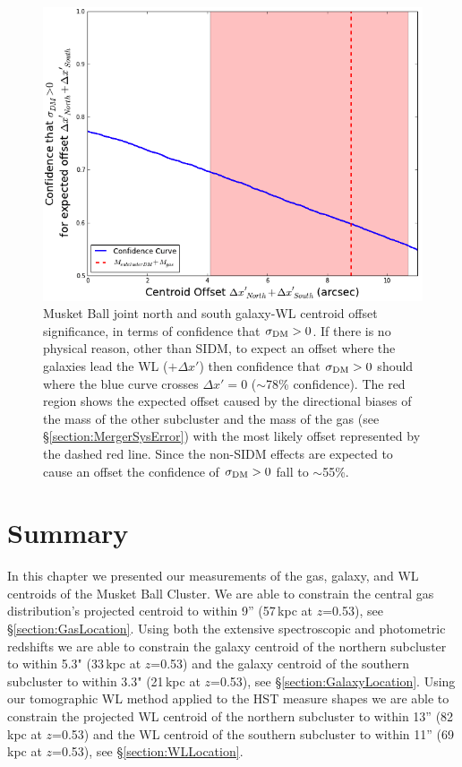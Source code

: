 \begin{figure}
\centering
\includegraphics[width=5in]{Chapter4/AnalysisFiles/NorthSouthJointAnalysis_delxPC.png}
\caption[Musket Ball joint northern and southern subcluster galaxy and weak lensing centroid offset significance.]{
Musket Ball joint north and south galaxy-WL centroid offset significance, in terms of confidence that $\sigma_{\rm DM}>0$.
If there is no physical reason, other than SIDM, to expect an offset where the galaxies lead the WL ($+\Delta x'$) then confidence that $\sigma_{\rm DM}>0$ should where the blue curve crosses $\Delta x'=0$ ($\sim$78\% confidence).
The red region shows the expected offset caused by the directional biases of the mass of the other subcluster and the mass of the gas (see \S\ref{section:MergerSysError}) with the most likely offset represented by the dashed red line.
Since the non-SIDM effects are expected to cause an offset the confidence of $\sigma_{\rm DM}>0$ fall to $\sim$55\%.
}
\label{figure:CentroidSignificance_NorthPlusSouth}
\end{figure}

\section{Summary}

In this chapter we presented our measurements of the gas, galaxy, and WL centroids of the Musket Ball Cluster.
We are able to constrain the central gas distribution's projected centroid to within 9'' (57\,kpc at $z$=0.53), see \S\ref{section:GasLocation}.
Using both the extensive spectroscopic and photometric redshifts we are able to constrain the galaxy centroid of the northern subcluster to within 5.3" (33\,kpc at $z$=0.53) and the galaxy centroid of the southern subcluster to within 3.3" (21\,kpc at $z$=0.53), see \S\ref{section:GalaxyLocation}.
Using our tomographic WL method applied to the HST measure shapes we are able to constrain the projected WL centroid of the northern subcluster to within 13'' (82\,kpc at $z$=0.53) and the WL centroid of the southern subcluster to within 11'' (69\,kpc at $z$=0.53), see \S\ref{section:WLLocation}.

